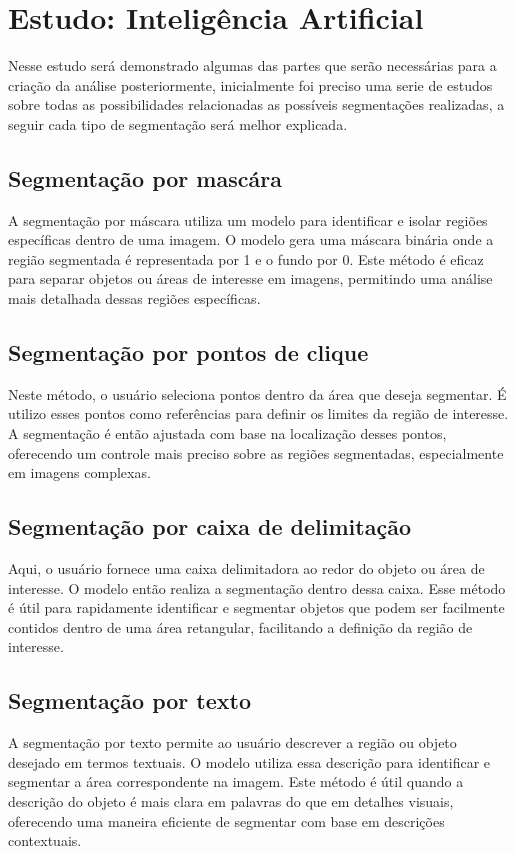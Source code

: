 \section{Estudo: Inteligência Artificial}
Nesse estudo será demonstrado algumas das partes que serão necessárias para a criação da análise posteriormente, 
inicialmente foi preciso uma serie de estudos sobre todas as possibilidades relacionadas as possíveis segmentações realizadas, 
a seguir cada tipo de segmentação será melhor explicada.

\subsection{Segmentação por mascára}
A segmentação por máscara utiliza um modelo para identificar e isolar regiões específicas dentro de uma imagem. 
O modelo gera uma máscara binária onde a região segmentada é representada por 1 e o fundo por 0.
 Este método é eficaz para separar objetos ou áreas de interesse em imagens, permitindo uma análise mais detalhada dessas regiões específicas.

\subsection{Segmentação por pontos de clique}
Neste método, o usuário seleciona pontos dentro da área que deseja segmentar.
É utilizo esses pontos como referências para definir os limites da região de interesse.
 A segmentação é então ajustada com base na localização desses pontos, oferecendo um controle mais preciso sobre as regiões segmentadas, especialmente em imagens complexas.

\subsection{Segmentação por caixa de delimitação}
Aqui, o usuário fornece uma caixa delimitadora ao redor do objeto ou área de interesse. 
O modelo então realiza a segmentação dentro dessa caixa. 
Esse método é útil para rapidamente identificar e segmentar objetos que podem ser facilmente contidos dentro de uma área retangular, facilitando a definição da região de interesse.


\subsection{Segmentação por texto}
A segmentação por texto permite ao usuário descrever a região ou objeto desejado em termos textuais. 
O modelo utiliza essa descrição para identificar e segmentar a área correspondente na imagem. 
Este método é útil quando a descrição do objeto é mais clara em palavras do que em detalhes visuais, oferecendo uma maneira eficiente de segmentar com base em descrições contextuais.


